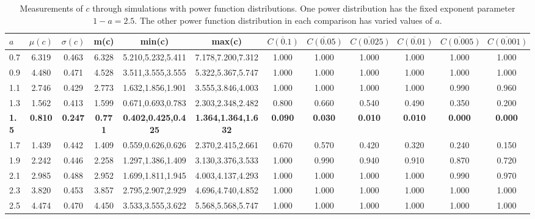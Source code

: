 \begin{table*}[h!]
\begin{center}
\begin{tabular}{| l | c | c | c | c | c | c | c | c | c | c | c |}\hline
$a$ & $\mu(c)$ & $\sigma(c)$ & m(c) & min(c) & max(c) & $\overline{C(0.1)}$ & $\overline{C(0.05)}$ & $\overline{C(0.025)}$ & $\overline{C(0.01)}$ & $\overline{C(0.005)}$ & $\overline{C(0.001)}$ \\\hline\hline
0.7 & 6.319 & 0.463 & 6.328 & 5.210,5.232,5.411 & 7.178,7.200,7.312  & 1.000  & 1.000  & 1.000  & 1.000  & 1.000  & 1.000 \\\hline
0.9 & 4.480 & 0.471 & 4.528 & 3.511,3.555,3.555 & 5.322,5.367,5.747  & 1.000  & 1.000  & 1.000  & 1.000  & 1.000  & 1.000 \\\hline
1.1 & 2.746 & 0.429 & 2.773 & 1.632,1.856,1.901 & 3.555,3.846,4.003  & 1.000  & 1.000  & 1.000  & 1.000  & 0.990  & 0.960 \\\hline
1.3 & 1.562 & 0.413 & 1.599 & 0.671,0.693,0.783 & 2.303,2.348,2.482  & 0.800  & 0.660  & 0.540  & 0.490  & 0.350  & 0.200 \\\hline
{\bf 1.5} & {\bf 0.810} & {\bf 0.247} & {\bf 0.771} & {\bf 0.402,0.425,0.425} & {\bf 1.364,1.364,1.632} & {\bf 0.090} & {\bf 0.030} & {\bf 0.010} & {\bf 0.010} & {\bf 0.000} & {\bf 0.000} \\\hline
1.7 & 1.439 & 0.442 & 1.409 & 0.559,0.626,0.626 & 2.370,2.415,2.661  & 0.670  & 0.570  & 0.420  & 0.320  & 0.240  & 0.150 \\\hline
1.9 & 2.242 & 0.446 & 2.258 & 1.297,1.386,1.409 & 3.130,3.376,3.533  & 1.000  & 0.990  & 0.940  & 0.910  & 0.870  & 0.720 \\\hline
2.1 & 2.985 & 0.488 & 2.952 & 1.699,1.811,1.945 & 4.003,4.137,4.293  & 1.000  & 1.000  & 1.000  & 1.000  & 0.990  & 0.970 \\\hline
2.3 & 3.820 & 0.453 & 3.857 & 2.795,2.907,2.929 & 4.696,4.740,4.852  & 1.000  & 1.000  & 1.000  & 1.000  & 1.000  & 1.000 \\\hline
2.5 & 4.474 & 0.470 & 4.450 & 3.533,3.555,3.622 & 5.568,5.568,5.747  & 1.000  & 1.000  & 1.000  & 1.000  & 1.000  & 1.000 \\\hline
\end{tabular}
\caption{Measurements of $c$ through simulations
with power function distributions.
One power distribution has the fixed exponent parameter $1-a=2.5$.
The other power function distribution in each comparison
has varied values of $a$.}
\end{center}
\end{table*}